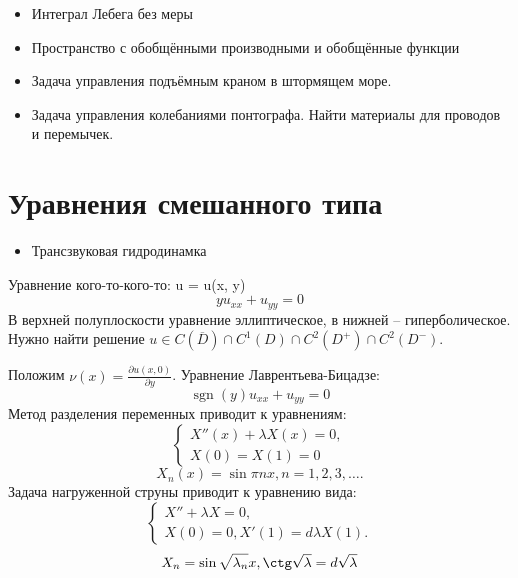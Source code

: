 \documentclass[11pt]{article}
\author{Sergey Makarov}
\date{\today}
\title{}
\begin{document}
\tableofcontents

\begin{itemize}
\item Интеграл Лебега без меры
\item Пространство с обобщёнными производными и обобщённые функции
\item Задача управления подъёмным краном в штормящем море.
\item Задача управления колебаниями понтографа. Найти материалы для проводов и перемычек.
\end{itemize}

\section{Уравнения смешанного типа}
\label{sec:orgb950b37}
\begin{itemize}
\item Трансзвуковая гидродинамка
\end{itemize}
Уравнение кого-то-кого-то:
u = u(x, y)
\begin{equation}
yu_{xx} + u_{yy} = 0
\end{equation}
В верхней полуплоскости уравнение эллиптическое, в нижней -- гиперболическое. Нужно найти
решение $u \in C(\overline{D}) \cap C^1(D) \cap C^2(D^+) \cap C^2(D^-)$.

Положим $\nu(x) = \frac{\partial u(x, 0)}{\partial y}$.
Уравнение Лаврентьева-Бицадзе:
\begin{equation}
\operatorname{sgn}(y)u_{xx} + u_{yy} = 0
\end{equation}
Метод разделения переменных приводит к уравнениям:
\begin{equation}
\begin{cases}
X''(x) + \lambda X(x) = 0, \\
X(0) = X(1) = 0
\end{cases}
\end{equation}
\begin{equation}
X_n(x) = \sin \pi nx, n = 1, 2, 3, \ldots.
\end{equation}
Задача нагруженной струны приводит к уравнению вида:
\begin{equation}
\begin{cases}
X'' + \lambda X = 0, \\
X(0) = 0, X'(1) = d\lambda X(1).
\end{cases}
\end{equation}
\begin{equation}
X_n = \sin \sqrt{\lambda_n}x, \ctg\sqrt{\lambda} = d\sqrt{\lambda}
\end{equation}
\end{document}
